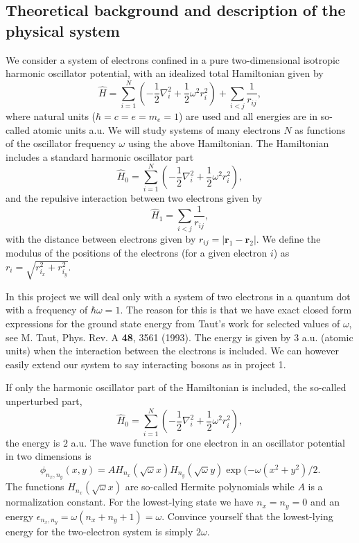 \documentclass[%
oneside,                 %
final,                   %
10pt]{article}
\begin{document}
\subsection{Theoretical background and description of the physical system}
We consider a system of electrons confined in a pure two-dimensional 
isotropic harmonic oscillator potential, with an idealized  total Hamiltonian given by
\begin{equation}
\label{eq:finalH}
\hat{H}=\sum_{i=1}^{N} \left(  -\frac{1}{2} \nabla_i^2 + \frac{1}{2} \omega^2r_i^2  \right)+\sum_{i<j}\frac{1}{r_{ij}},
\end{equation}
where natural units ($\hbar=c=e=m_e=1$) are used and all energies are in so-called atomic units a.u. We will study systems of many electrons $N$ as functions of the oscillator frequency  $\omega$ using the above Hamiltonian.  The Hamiltonian includes a standard harmonic oscillator part
\begin{equation*}
\hat{H}_0=\sum_{i=1}^{N} \left(  -\frac{1}{2} \nabla_i^2 + \frac{1}{2} \omega^2r_i^2  \right),
\end{equation*}
and the repulsive interaction between two electrons given by
\begin{equation*}
\hat{H}_1=\sum_{i<j}\frac{1}{r_{ij}},
\end{equation*}
with the distance between electrons given by $r_{ij}=\vert \bm{r}_1-\bm{r}_2\vert$. We define the 
modulus of the positions of the electrons (for a given electron $i$) as $r_i = \sqrt{r_{i_x}^2+r_{i_y}^2}$.

In this project  we will deal only with a system of
two electrons in a quantum dot with a frequency of $\hbar\omega = 1$. 
The reason for this is that we have exact closed form expressions 
for the ground state energy from Taut's work for selected values of $\omega$, 
see M. Taut, Phys. Rev. A \textbf{48}, 3561 (1993).
The energy is given by $3$ a.u.  (atomic units) when the interaction between the electrons is included. We can however easily extend our system to say interacting bosons as in project 1.

If only the harmonic oscillator part of the Hamiltonian is included,
the so-called unperturbed part,
\begin{equation*} 
\hat{H}_0=\sum_{i=1}^{N} \left(  -\frac{1}{2} \nabla_i^2 + \frac{1}{2} \omega^2r_i^2  \right),
\end{equation*}
the energy is $2$ a.u.
The wave function for one electron in an oscillator potential in two dimensions is
\begin{equation*}
\phi_{n_x,n_y}(x,y) = A H_{n_x}(\sqrt{\omega}x)H_{n_y}(\sqrt{\omega}y)\exp{(-\omega(x^2+y^2)/2}.
\end{equation*}
The functions $H_{n_x}(\sqrt{\omega}x)$ are so-called Hermite polynomials  while $A$ is a normalization constant. 
For the lowest-lying state we have $n_x=n_y=0$ and an energy $\epsilon_{n_x,n_y}=\omega(n_x+n_y+1) = \omega$.
Convince yourself that the lowest-lying energy for the two-electron system  is simply $2\omega$.
\end{document}
